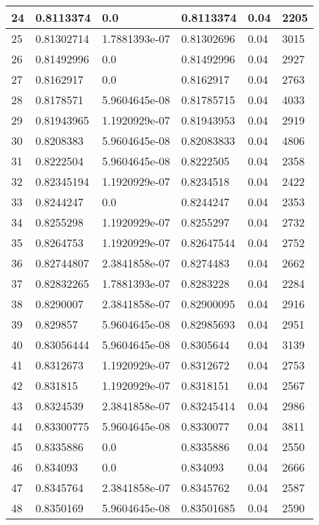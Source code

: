 \begin{longtable}{|l|l|l|l|l|l|}
24 & 0.8113374 & 0.0 & 0.8113374 & 0.04 & 2205 \\ \hline 
25 & 0.81302714 & 1.7881393e-07 & 0.81302696 & 0.04 & 3015 \\ \hline 
26 & 0.81492996 & 0.0 & 0.81492996 & 0.04 & 2927 \\ \hline 
27 & 0.8162917 & 0.0 & 0.8162917 & 0.04 & 2763 \\ \hline 
28 & 0.8178571 & 5.9604645e-08 & 0.81785715 & 0.04 & 4033 \\ \hline 
29 & 0.81943965 & 1.1920929e-07 & 0.81943953 & 0.04 & 2919 \\ \hline 
30 & 0.8208383 & 5.9604645e-08 & 0.82083833 & 0.04 & 4806 \\ \hline 
31 & 0.8222504 & 5.9604645e-08 & 0.8222505 & 0.04 & 2358 \\ \hline 
32 & 0.82345194 & 1.1920929e-07 & 0.8234518 & 0.04 & 2422 \\ \hline 
33 & 0.8244247 & 0.0 & 0.8244247 & 0.04 & 2353 \\ \hline 
34 & 0.8255298 & 1.1920929e-07 & 0.8255297 & 0.04 & 2732 \\ \hline 
35 & 0.8264753 & 1.1920929e-07 & 0.82647544 & 0.04 & 2752 \\ \hline 
36 & 0.82744807 & 2.3841858e-07 & 0.8274483 & 0.04 & 2662 \\ \hline 
37 & 0.82832265 & 1.7881393e-07 & 0.8283228 & 0.04 & 2284 \\ \hline 
38 & 0.8290007 & 2.3841858e-07 & 0.82900095 & 0.04 & 2916 \\ \hline 
39 & 0.829857 & 5.9604645e-08 & 0.82985693 & 0.04 & 2951 \\ \hline 
40 & 0.83056444 & 5.9604645e-08 & 0.8305644 & 0.04 & 3139 \\ \hline 
41 & 0.8312673 & 1.1920929e-07 & 0.8312672 & 0.04 & 2753 \\ \hline 
42 & 0.831815 & 1.1920929e-07 & 0.8318151 & 0.04 & 2567 \\ \hline 
43 & 0.8324539 & 2.3841858e-07 & 0.83245414 & 0.04 & 2986 \\ \hline 
44 & 0.83300775 & 5.9604645e-08 & 0.8330077 & 0.04 & 3811 \\ \hline 
45 & 0.8335886 & 0.0 & 0.8335886 & 0.04 & 2550 \\ \hline 
46 & 0.834093 & 0.0 & 0.834093 & 0.04 & 2666 \\ \hline 
47 & 0.8345764 & 2.3841858e-07 & 0.8345762 & 0.04 & 2587 \\ \hline 
48 & 0.8350169 & 5.9604645e-08 & 0.83501685 & 0.04 & 2590 \\ \hline 

\end{longtable}
